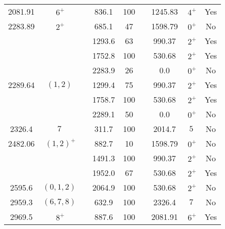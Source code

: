 \begin{tabular}{ccccccccc}
2081.91  & $~6^+$     &            &  836.1     & 100        &                  & 1245.83         & $~4^+$         & Yes               \\
2283.89  & $~2^+$     &            &  685.1     &  47        &                  & 1598.79         & $~0^+$         & No                \\
         &            &            & 1293.6     &  63        &                  &  990.37         & $~2^+$         & Yes               \\
         &            &            & 1752.8     & 100        &                  &  530.68         & $~2^+$         & Yes               \\
         &            &            & 2283.9     &  26        &                  &    0.0          & $~0^+$         & No                \\
2289.64  & $(1,2)$    &            & 1299.4     &  75        &                  &  990.37         & $~2^+$         & Yes               \\
         &            &            & 1758.7     & 100        &                  &  530.68         & $~2^+$         & Yes               \\
         &            &            & 2289.1     &  50        &                  &    0.0          & $~0^+$         & No                \\
2326.4   & $7$        &            &  311.7     & 100        &                  & 2014.7          & $5$            & No                \\
2482.06  & $~(1,2)^+$ &            &  882.7     &  10        &                  & 1598.79         & $~0^+$         & No                \\
         &            &            & 1491.3     & 100        &                  &  990.37         & $~2^+$         & No                \\
         &            &            & 1952.0     &  67        &                  &  530.68         & $~2^+$         & Yes               \\
2595.6   & $(0,1,2)$  &            & 2064.9     & 100        &                  &  530.68         & $~2^+$         & No                \\
2959.3   & $(6,7,8)$  &            &  632.9     & 100        &                  &  2326.4         & $7$            & No                \\
2969.5   & $~8^+$     &            &  887.6     & 100        &                  &  2081.91        & $~6^+$         & Yes               \\
\hline
\end{tabular}